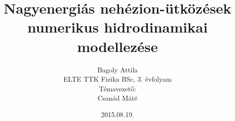 \documentclass{beamer}
\title[Numerikus hidrodinamika]{Nagyenergiás nehézion-ütközések numerikus hidrodinamikai modellezése}
\author[Bagoly Attila]{Bagoly Attila\\ ELTE TTK Fizika BSc, 3. évfolyam \vspace{0.5cm}\\  Témavezető:\\ Csanád Máté}
\date[2015.08.19.]{2015.08.19.}
\institute[ELTE]{ELTE TTK Atomfizikai tanszék}
\begin{document}
\begin{frame}
  \titlepage
\end{frame}







\end{document}
